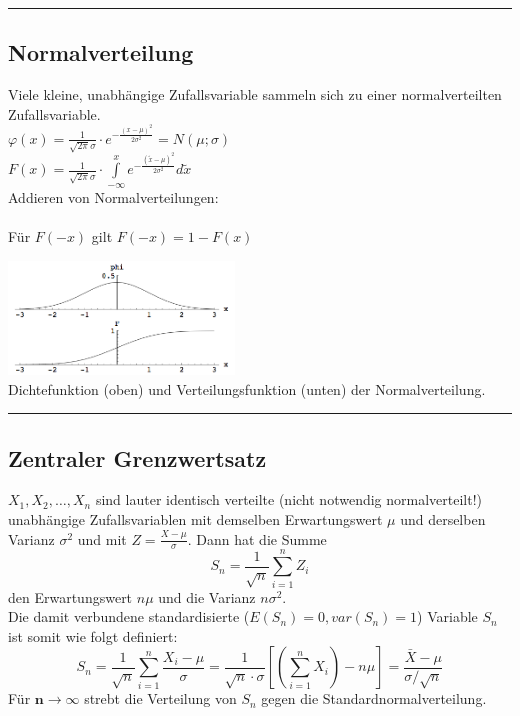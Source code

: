 \hrule
	\subsection{Normalverteilung \skript{\pageref{sk-normalverteilung}}}
    \begin{minipage}{10cm}
    Viele kleine, unabhängige Zufallsvariable sammeln sich zu einer
    normalverteilten Zufallsvariable.\\
    $\varphi(x)=\frac{1}{\sqrt{2
    \pi}\sigma}\cdot e^{-\frac{(x-\mu)^2}{2\sigma^2}} = N(\mu ; \sigma) $\\ 
    $F(x)=\frac{1}{\sqrt{2\pi}\sigma}\cdot \int\limits^{x}_{-\infty}{e^{-\frac{(\tilde{x} -\mu)^2}{2\sigma^2}}} d\tilde{x} $ \\
    Addieren von Normalverteilungen: \\
     \\
    Für $F(-x)$ gilt $F(-x) = 1 - F(x)$
  	\end{minipage}
	\begin{minipage}{8cm}
      \includegraphics[width=6cm]{./bilder/normalverteilung.png}\\
		Dichtefunktion (oben) und Verteilungsfunktion (unten) der
		Normalverteilung.
   	\end{minipage}
	\hrule
  
	\subsection{Zentraler Grenzwertsatz \skript{\pageref{sk-zentraler-grenzwertsatz}}}
    $X_1, X_2, \ldots , X_n$ sind lauter identisch verteilte (nicht notwendig normalverteilt!)
    unabhängige Zufallsvariablen mit demselben Erwartungswert $\mu$ und derselben Varianz $\sigma^2$
    und mit $Z = \frac{X-\mu}{\sigma}$. Dann hat die Summe
    \begin{equation}
      S_n = \frac{1}{\sqrt{n}}\sum_{i=1}^n Z_i \nonumber
    \end{equation}
    den Erwartungswert $n \mu$ und die Varianz $n \sigma^2$.\\
    Die damit verbundene standardisierte ($E(S_n) = 0, var(S_n) = 1$) Variable $S_n$ ist somit wie
    folgt definiert: \\ 
    \begin{equation}
      S_n = \frac{1}{\sqrt{n}}\sum_{i=1}^n \frac{X_i - \mu}{\sigma}
      = \frac{1}{\sqrt{n}\cdot \sigma}\left[\left(\sum\limits_{i=1}^n X_i\right) -n \mu\right]
      =\dfrac{\bar{X} - \mu}{\sigma / \sqrt{n}} \nonumber
    \end{equation}
    Für $\boldsymbol{n \to \infty}$ strebt die Verteilung von $S_n$ gegen die
    Standardnormalverteilung. \\


